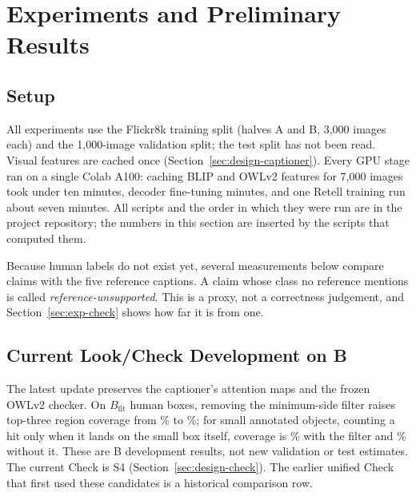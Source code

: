 \section{Experiments and Preliminary Results}
\label{sec:experiments}

\subsection{Setup}
All experiments use the Flickr8k training split (halves A and B, 3{,}000 images each) and the 1{,}000-image validation split; the test split has not been read. Visual features are cached once (Section~\ref{sec:design-captioner}). Every GPU stage ran on a single Colab A100: caching BLIP and OWLv2 features for 7{,}000 images took under ten minutes, decoder fine-tuning \FtMinutes{} minutes, and one Retell training run about seven minutes. All scripts and the order in which they were run are in the project repository; the numbers in this section are inserted by the scripts that computed them.

Because human labels do not exist yet, several measurements below compare claims with the five reference captions. A claim whose class no reference mentions is called \emph{reference-unsupported}. This is a proxy, not a correctness judgement, and Section~\ref{sec:exp-check} shows how far it is from one.

\subsection{Current Look/Check Development on B}
The latest update preserves the captioner's attention maps and the frozen OWLv2 checker. On $B_{\mathrm{fit}}$ human boxes, removing the minimum-side filter raises top-three region coverage from \LCRLookBefore\% to \LCRLookAfter\%; for small annotated objects, counting a hit only when it lands on the small box itself, coverage is \LCRSmallBefore\% with the filter and \LCRSmallAfter\% without it. These are B development results, not new validation or test estimates. The current Check is S4 (Section~\ref{sec:design-check}). The earlier unified Check that first used these candidates is a historical comparison row.


